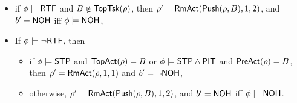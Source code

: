 {\begin{itemize}
\begin{itemize}
\begin{itemize}
				\item if $\topact(\rho) = B$, then $\rho' = \rmact(\rho, 1, 1)$ and $b' = \neg \nohflag$,
			\end{itemize}
			\item if $\phi \models {\sf RTF}$ and $B \notin \mathsf{TopTsk}(\rho)$, then $\rho' = \mathsf{RmAct}( \mathsf{Push}(\rho, B), 1, 2)$, and $b' = {\sf NOH}$ iff $\phi \models {\sf NOH}$, 
			\item If $\phi \models \neg {\sf RTF}$, then
			\begin{itemize}
				\item if $\phi \models {\sf STP}$ and $\topact(\rho) = B$ or $\phi \models {\sf STP}\wedge{\sf PIT}$ and $\mathsf{PreAct}(\rho) = B$, then $\rho' = \rmact(\rho, 1, 1)$ and $b' = \neg \nohflag$,
				\item otherwise, $\rho' = \mathsf{RmAct}( \mathsf{Push}(\rho, B), 1, 2)$, and $b' = {\sf NOH}$ iff $\phi \models {\sf NOH}$.
			\end{itemize}
		\end{itemize}
\end{itemize}

\smallskip
\noindent \fbox{$\phi \models \ndmflag$}

}
